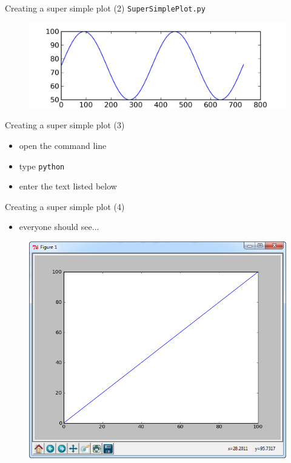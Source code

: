 \documentclass[t]{beamer}
\begin{document}
\begin{frame}{Creating a super simple plot (2)}
	\small{\texttt{SuperSimplePlot.py}}
	\vspace{-15pt}\begin{figure}[ht]
		\centering
		\includegraphics[width=4.5in]{figures/SuperSimplePlot.png}
	\end{figure}
\end{frame}

\begin{frame}{Creating a super simple plot (3)}
	\begin{itemize}
		\item open the command line
		\item type \texttt{python}
		\item enter the text listed below
	\end{itemize}
	\vspace{-15pt}\begin{figure}[ht]
  		\centering
	        
 	\end{figure}
\end{frame}

\begin{frame}{Creating a super simple plot (4)}
	\begin{itemize}
		\item everyone should see...
	\end{itemize}
	\vspace{-15pt}\begin{figure}[ht]
  		\centering
		\includegraphics[height=0.70\textheight]{figures/matplotlibInClass.png}
 	\end{figure}
\end{frame}
\end{document}
